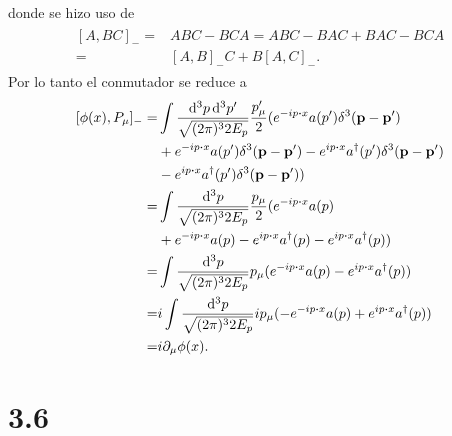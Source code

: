 \documentclass{article}
\begin{document}
donde se hizo uso de
\begin{align}\label{ec:conmutador_identidad}
\begin{split}
[A,BC]_-=&ABC-BCA=ABC-BAC+BAC-BCA\\
=&[A,B]_-C+B[A,C]_-.
\end{split}
\end{align}
Por lo tanto el conmutador se reduce a
\begin{align}
\begin{split}
[\phi(x),P_\mu]_-=&\int\frac{\dd[3]{p}\dd[3]{p'}}{\sqrt{(2\pi)^32E_p}}\frac{p'_\mu}{2}(e^{-ip\vdot x}a(p')\delta^3(\vb{p}-\vb{p'})\\
&+e^{-ip\vdot x}a(p')\delta^3(\vb{p}-\vb{p'})-e^{ip\vdot x}a^\dagger(p')\delta^3(\vb{p}-\vb{p'})\\
&-e^{ip\vdot x}a^\dagger(p')\delta^3(\vb{p}-\vb{p'}))\\
=&\int\frac{\dd[3]{p}}{\sqrt{(2\pi)^32E_p}}\frac{p_\mu}{2}(e^{-ip\vdot x}a(p)\\
&+e^{-ip\vdot x}a(p)-e^{ip\vdot x}a^\dagger(p)-e^{ip\vdot x}a^\dagger(p))\\
=&\int\frac{\dd[3]{p}}{\sqrt{(2\pi)^32E_p}}p_\mu(e^{-ip\vdot x}a(p)-e^{ip\vdot x}a^\dagger(p))\\
=&i\int\frac{\dd[3]{p}}{\sqrt{(2\pi)^32E_p}}ip_\mu(-e^{-ip\vdot x}a(p)+e^{ip\vdot x}a^\dagger(p))\\
=&i\partial_\mu\phi(x).
\end{split}
\end{align}

\section*{3.6}
\end{document}
